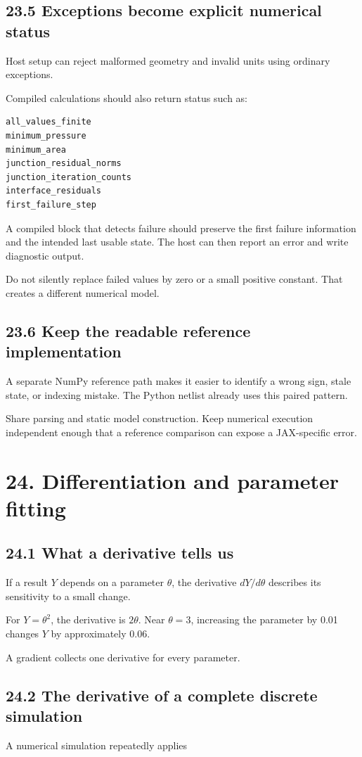 \documentclass[11pt,a4paper]{article}
\begin{document}
\subsection{23.5 Exceptions become explicit numerical status}
Host setup can reject malformed geometry and invalid units using ordinary exceptions.

Compiled calculations should also return status such as:


\begin{lstlisting}
all_values_finite
minimum_pressure
minimum_area
junction_residual_norms
junction_iteration_counts
interface_residuals
first_failure_step
\end{lstlisting}
A compiled block that detects failure should preserve the first failure information and the intended last usable state. The host can then report an error and write diagnostic output.

Do not silently replace failed values by zero or a small positive constant. That creates a different numerical model.

\subsection{23.6 Keep the readable reference implementation}
A separate NumPy reference path makes it easier to identify a wrong sign, stale state, or indexing mistake. The Python netlist already uses this paired pattern.

Share parsing and static model construction. Keep numerical execution independent enough that a reference comparison can expose a JAX-specific error.

\clearpage
\section{24. Differentiation and parameter fitting}
\subsection{24.1 What a derivative tells us}
If a result \(Y\) depends on a parameter \(\theta\), the derivative \(dY/d\theta\) describes its sensitivity to a small change.

For \(Y=\theta^2\), the derivative is \(2\theta\). Near \(\theta=3\), increasing the parameter by 0.01 changes \(Y\) by approximately 0.06.

A gradient collects one derivative for every parameter.

\subsection{24.2 The derivative of a complete discrete simulation}
A numerical simulation repeatedly applies
\end{document}
